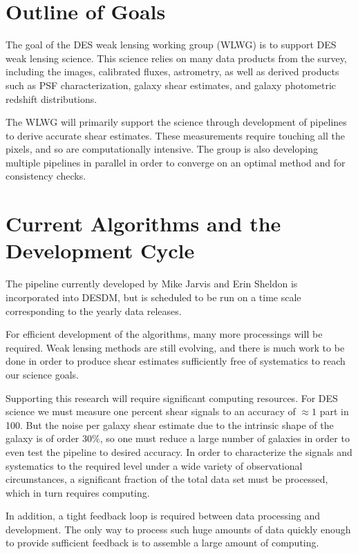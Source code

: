 \documentclass[12pt]{article}
\begin{document}
\section{Outline of Goals}

The goal of the DES weak lensing working group (WLWG) is to support DES weak
lensing science.  This science relies on many data products from the survey,
including the images, calibrated fluxes, astrometry, as well as derived
products such as PSF characterization, galaxy shear estimates, and galaxy
photometric redshift distributions.

The WLWG will primarily support the science through development of pipelines to
derive accurate shear estimates.  These measurements require touching all the
pixels, and so are computationally intensive.  The group is also developing
multiple pipelines in parallel in order to converge on an optimal method and
for consistency checks.  


\section{Current Algorithms and the Development Cycle}

The pipeline currently developed by Mike Jarvis and Erin Sheldon is
incorporated into DESDM, but is scheduled to be run on a time scale
corresponding to the yearly data releases. 

For efficient development of the algorithms, many more processings will be
required.  Weak lensing methods are still evolving, and there is much
work to be done in order to produce shear estimates sufficiently free of
systematics to reach our science goals.

Supporting this research will require significant computing resources. For DES
science we must measure one percent shear signals to an accuracy of $\approx 1$
part in 100.  But the noise per galaxy shear estimate due to the intrinsic
shape of the galaxy is of order 30\%, so one must reduce a large number of
galaxies in order to even test the pipeline to desired accuracy.  In order to
characterize the signals and systematics to the required level under a wide
variety of observational circumstances, a significant fraction of the total
data set must be processed, which in turn requires computing.

In addition, a tight feedback loop is required between data processing and
development.  The only way to process such huge amounts of data quickly enough
to provide sufficient feedback is to assemble a large amount of computing.
\end{document}

